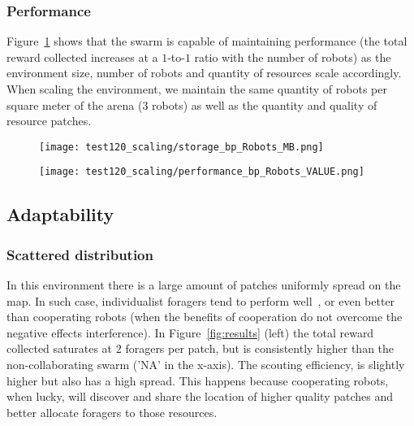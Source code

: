 \documentclass[runningheads]{llncs}
\begin{document}
\vspace{-5mm}
\subsubsection{Performance}

Figure~\ref{fig:scal-performance} shows that the swarm is capable of maintaining performance (the total reward collected increases at a $1$-to-$1$ ratio with the number of robots) as the environment size, number of robots and quantity of resources scale accordingly. When scaling the environment, we maintain the same quantity of robots per square meter of the arena (3 robots) as well as the quantity and quality of resource patches. 

\begin{figure}
    \centering
    \begin{minipage}{.475\textwidth}
        \centering
        \texttt{[image: test120\_scaling/storage\_bp\_Robots\_MB.png]}
        \label{fig:scal-storage}
    \end{minipage}
    \hfill
    \centering
    \begin{minipage}{.475\textwidth}
        \centering
        \texttt{[image: test120\_scaling/performance\_bp\_Robots\_VALUE.png]}
        \label{fig:scal-performance}
    \end{minipage}
\end{figure}


\subsection{Adaptability}
\label{ssec:adaptability}

\subsubsection{Scattered distribution}
\label{sssec:scattered}
In this environment there is a large amount of patches uniformly spread on the map. In such case, individualist foragers tend to perform well~\cite{pitonakova_icr_2018,wilson_sociobiology_2000}, or even better than cooperating robots (when the benefits of cooperation do not overcome the negative effects interference). In Figure~\ref{fig:results} (left) the total reward collected saturates at $2$ foragers per patch, but is consistently higher than the non-collaborating swarm ('NA' in the x-axis). The scouting efficiency, is slightly higher but also has a high spread. This happens because cooperating robots, when lucky, will discover and share the location of higher quality patches and better allocate foragers to those resources.
\end{document}
